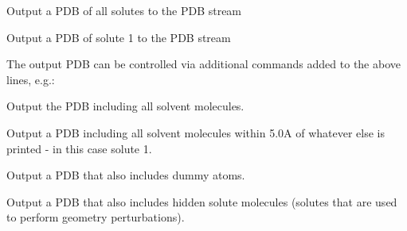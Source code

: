 \documentclass[letterpaper,10pt,english]{sphinxmanual}
\begin{document}
Output a PDB of all solutes to the PDB stream

%
\begin{sphinxVerbatim}[commandchars=\\\{\}]
  
\end{sphinxVerbatim}

Output a PDB of solute 1 to the PDB stream

The output PDB can be controlled via additional commands added to the above lines, e.g.:

%
\begin{sphinxVerbatim}[commandchars=\\\{\}]
   
\end{sphinxVerbatim}

Output the PDB including all solvent molecules.

%
\begin{sphinxVerbatim}[commandchars=\\\{\}]
   
\end{sphinxVerbatim}

Output a PDB including all solvent molecules within 5.0A of whatever else is printed - in this case solute 1.

%
\begin{sphinxVerbatim}[commandchars=\\\{\}]
   
\end{sphinxVerbatim}

Output a PDB that also includes dummy atoms.

%
\begin{sphinxVerbatim}[commandchars=\\\{\}]
   
\end{sphinxVerbatim}

Output a PDB that also includes hidden solute molecules (solutes that are used to perform geometry perturbations).

%
\begin{sphinxVerbatim}[commandchars=\\\{\}]
   
\end{sphinxVerbatim}
\end{document}
